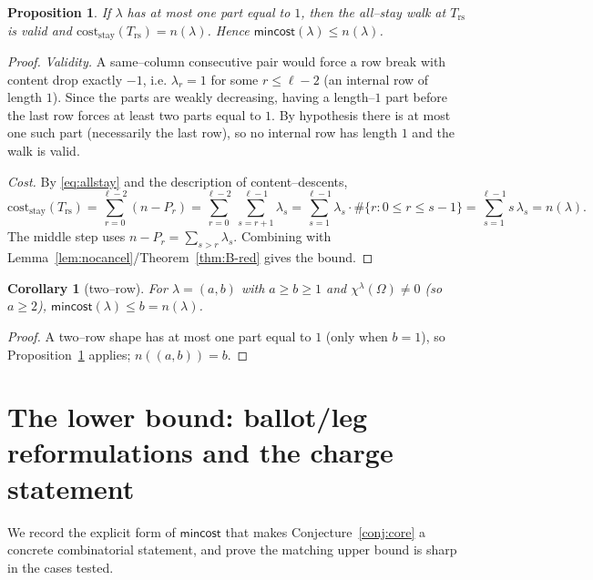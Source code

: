 \documentclass[11pt]{article}
\newtheorem{proposition}[theorem]{Proposition}
\newtheorem{corollary}[theorem]{Corollary}
\theoremstyle{definition}
\begin{document}
\begin{proposition}\label{prop:ub}
If $\lambda$ has at most one part equal to $1$, then the all--stay walk at
$T_{\mathrm{rs}}$ is valid and
$\mathrm{cost}_{\text{stay}}(T_{\mathrm{rs}})=n(\lambda)$. Hence
$\mathsf{mincost}(\lambda)\le n(\lambda)$.
\end{proposition}

\begin{proof}
\emph{Validity.} A same--column consecutive pair would force a row break with
content drop exactly $-1$, i.e. $\lambda_r=1$ for some $r\le\ell-2$ (an
internal row of length $1$). Since the parts are weakly decreasing, having a
length--$1$ part before the last row forces at least two parts equal to $1$.
By hypothesis there is at most one such part (necessarily the last row), so no
internal row has length $1$ and the walk is valid.

\emph{Cost.} By \eqref{eq:allstay} and the description of content--descents,
\[
\mathrm{cost}_{\text{stay}}(T_{\mathrm{rs}})
=\sum_{r=0}^{\ell-2}(n-P_r)
=\sum_{r=0}^{\ell-2}\ \sum_{s=r+1}^{\ell-1}\lambda_s
=\sum_{s=1}^{\ell-1}\lambda_s\cdot\#\{r:0\le r\le s-1\}
=\sum_{s=1}^{\ell-1}s\,\lambda_s=n(\lambda).
\]
The middle step uses $n-P_r=\sum_{s>r}\lambda_s$. Combining with
Lemma~\ref{lem:nocancel}/Theorem~\ref{thm:B-red} gives the bound.
\end{proof}

\begin{corollary}[two--row]\label{cor:tworow}
For $\lambda=(a,b)$ with $a\ge b\ge1$ and $\chi^\lambda(\Omega)\ne0$ (so
$a\ge2$), $\mathsf{mincost}(\lambda)\le b=n(\lambda)$.
\end{corollary}
\begin{proof}
A two--row shape has at most one part equal to $1$ (only when $b=1$), so
Proposition~\ref{prop:ub} applies; $n((a,b))=b$.
\end{proof}

\section{The lower bound: ballot/leg reformulations and the charge statement}
\label{sec:lb}

We record the explicit form of $\mathsf{mincost}$ that makes
Conjecture~\ref{conj:core} a concrete combinatorial statement, and prove the
matching upper bound is sharp in the cases tested.
\end{document}

